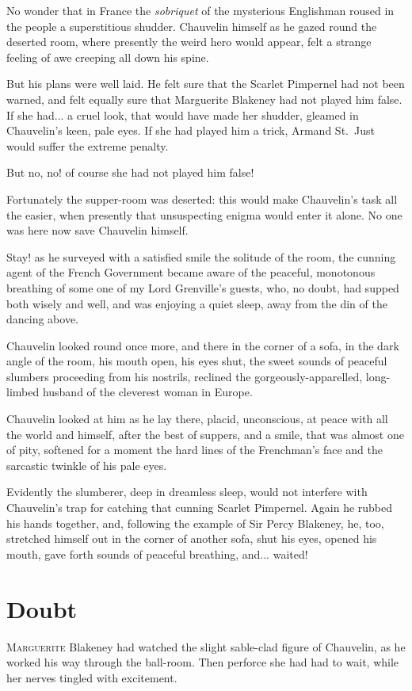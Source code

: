 \documentclass[paper=5.5in:8.5in,BCOR=7mm,twoside,DIV=calc,12pt,usegeometry,chapterprefix,endperiod,headings=big]{scrbook}
\begin{document}
No wonder that in France the \textit{sobriquet} of the mysterious Englishman roused in the people a superstitious shudder. Chauvelin himself as he gazed round the deserted room, where presently the weird hero would appear, felt a strange feeling of awe creeping all down his spine.

But his plans were well laid. He felt sure that the Scarlet Pimpernel had not been warned, and felt equally sure that Marguerite Blakeney had not played him false. If she had... a cruel look, that would have made her shudder, gleamed in Chauvelin's keen, pale eyes. If she had played him a trick, Armand St.~Just would suffer the extreme penalty.

But no, no! of course she had not played him false!

Fortunately the supper-room was deserted: this would make Chauvelin's task all the easier, when presently that unsuspecting enigma would enter it alone. No one was here now save Chauvelin himself.

Stay! as he surveyed with a satisfied smile the solitude of the room, the cunning agent of the French Government became aware of the peaceful, monotonous breathing of some one of my Lord Grenville's guests, who, no doubt, had supped both wisely and well, and was enjoying a quiet sleep, away from the din of the dancing above.

Chauvelin looked round once more, and there in the corner of a sofa, in the dark angle of the room, his mouth open, his eyes shut, the sweet sounds of peaceful slumbers proceeding from his nostrils, reclined the gorgeously-apparelled, long-limbed husband of the cleverest woman in Europe.

Chauvelin looked at him as he lay there, placid, unconscious, at peace with all the world and himself, after the best of suppers, and a smile, that was almost one of pity, softened for a moment the hard lines of the Frenchman's face and the sarcastic twinkle of his pale eyes.

Evidently the slumberer, deep in dreamless sleep, would not interfere with Chauvelin's trap for catching that cunning Scarlet Pimpernel. Again he rubbed his hands together, and, following the example of Sir Percy Blakeney, he, too, stretched himself out in the corner of another sofa, shut his eyes, opened his mouth, gave forth sounds of peaceful breathing, and... waited!

\chapter{Doubt}
\lettrine[lines=4]{M}{arguerite} Blakeney had watched the slight sable-clad figure of Chauvelin, as he worked his way through the ball-room. Then perforce she had had to wait, while her nerves tingled with excitement.
\end{document}
